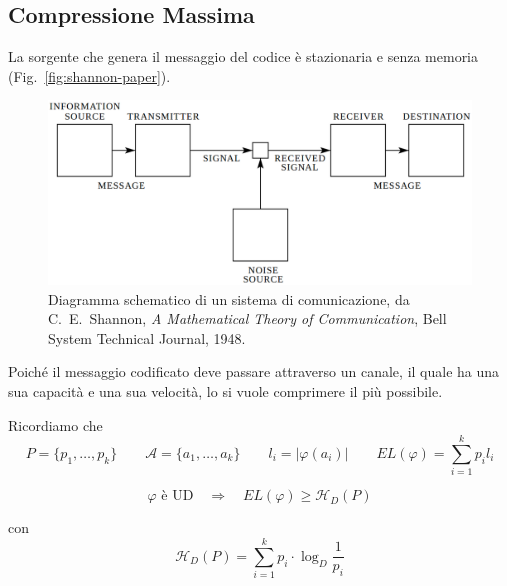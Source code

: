 \subsection{Compressione Massima}
La sorgente che genera il messaggio del codice è stazionaria e senza memoria (Fig.~\vref{fig:shannon-paper}).
\begin{figure}[htb]
    \centering
    \includegraphics[width=.7\textwidth]{figures/shannon-paper.png}
    \caption{Diagramma schematico di un sistema di comunicazione, da C.~E.~Shannon, \textit{A Mathematical Theory of Communication}, Bell System Technical Journal, 1948.}
    \label{fig:shannon-paper}
\end{figure}
Poiché il messaggio codificato deve passare attraverso un canale, il quale ha una sua capacità e una sua velocità, lo si vuole comprimere il più possibile.

Ricordiamo che 
$$
    P=\{p_1,\dots,p_k\} \qquad \mathcal{A}=\{a_1,\dots,a_k\} \qquad l_i=|\varphi(a_i)| \qquad EL(\varphi) = \sum_{i=1}^k p_il_i
$$

\begin{theorem}
    $$
        \varphi \text{ è UD} \quad \Rightarrow \quad EL(\varphi) \geq \mathcal{H}_D(P)
    $$

    con 
    $$
        \mathcal{H}_D(P) = \sum_{i=1}^k p_i\cdot\log_D\frac{1}{p_i}
    $$
\end{theorem}

